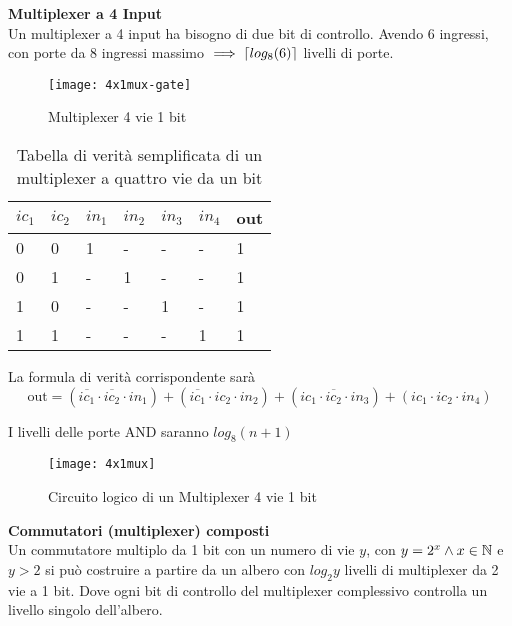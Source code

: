 \begin{defn}
	\textbf{Multiplexer a 4 Input} \\
	Un multiplexer a 4 input ha bisogno di due bit di controllo. Avendo 6
	ingressi, con porte da 8 ingressi massimo $ \implies \ceil*{ log_8(6)} $
	livelli di porte.
	
	
	\begin{figure}[H]
		\centering
		\texttt{[image: 4x1mux-gate]}
		\caption{Multiplexer 4 vie 1 bit}
	\end{figure}
	
	\begin{table}[H]
		\centering
		\caption{Tabella di verità semplificata di un multiplexer a quattro vie da un bit}
		\label{tab:multiplexer3}
		\begin{tabular}{|llllll|l|}
			\hline
			$ ic_1 $ & $ ic_2 $ & $ in_1 $ & $ in_2 $ & $ in_3 $ & $ in_4 $ &
			out \\ \hline
			0     & 0     & 1     & -     & -     & -     & 1   \\ \hline
			0     & 1     & -     & 1     & -     & -     & 1   \\ \hline
			1     & 0     & -     & -     & 1     & -     & 1   \\ \hline
			1     & 1     & -     & -     & -     & 1     & 1   \\ \hline
		\end{tabular}
	\end{table}
	
	
	La formula di verità corrispondente sarà
	\[ \text{out} = (\overbar{ic_1} \cdot \overbar{ic_2} \cdot in_1) +
	(\overbar{ic_1} \cdot ic_2 \cdot in_2) + (ic_1 \cdot \overbar{ic_2} \cdot
	in_3) + (ic_1\cdot ic_2 \cdot in_4)  \]
	
	I livelli delle porte AND saranno $ log_8(n+1) $
	
	\begin{figure}[H]
		\centering
		\texttt{[image: 4x1mux]}
		\caption{Circuito logico di un Multiplexer 4 vie 1 bit}
	\end{figure}
\end{defn}

\begin{defn}
	\textbf{Commutatori (multiplexer) composti} \\
	Un commutatore multiplo da 1 bit con un numero di vie $ y $, con $ y = 2^x
	\land x \in \N $ e $ y > 2 $ si può costruire a partire da un albero con $
	log_2y $ livelli di multiplexer da 2 vie a 1 bit. Dove ogni bit di controllo
	del multiplexer complessivo controlla un livello singolo dell'albero.

\end{defn}

